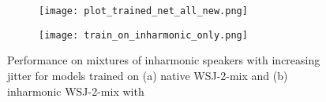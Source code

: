 \documentclass{article}
\begin{document}
\vspace*{-3mm}
\begin{figure}[t]
  \centering
  \begin{subfigure}[l]{0.23\textwidth}
  \texttt{[image: plot\_trained\_net\_all\_new.png]}
  \caption{}
  \label{fig:plot_trained_net}
  \end{subfigure}
\begin{subfigure}[l]{0.23\textwidth}
  \texttt{[image: train\_on\_inharmonic\_only.png]}
  \caption{}
  \label{fig:plot_train_on_inharmonic_only}
  \end{subfigure}
  \caption{Performance on mixtures of inharmonic speakers with increasing jitter  for models trained on (a) native WSJ-2-mix and (b) inharmonic WSJ-2-mix with }
 \vspace*{-6mm}
\end{figure}
\end{document}
